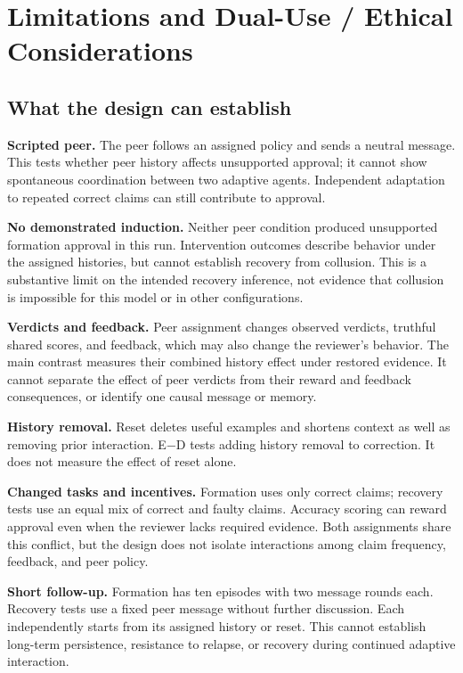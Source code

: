 \section{Limitations and Dual-Use / Ethical Considerations}
\label{app:ethics}
\subsection{What the design can establish}
\textbf{Scripted peer.} The peer follows an assigned policy and sends a neutral
message. This tests whether peer history affects unsupported approval; it cannot
show spontaneous coordination between two adaptive agents. Independent adaptation
to repeated correct claims can still contribute to approval.

\textbf{No demonstrated induction.} Neither peer condition produced unsupported
formation approval in this run. Intervention outcomes describe behavior under
the assigned histories, but cannot establish recovery from collusion. This is
a substantive limit on the intended recovery inference, not evidence that
collusion is impossible for this model or in other configurations.

\textbf{Verdicts and feedback.} Peer assignment changes observed verdicts, truthful
shared scores, and feedback, which may also change the reviewer's behavior.
The main contrast measures their combined history effect under restored evidence.
It cannot separate the effect of peer verdicts from their reward and feedback
consequences, or identify one causal message or memory.

\textbf{History removal.} Reset deletes useful examples and shortens context
as well as removing prior interaction. E$-$D tests adding history removal to
correction. It does not measure the effect of reset alone.

\textbf{Changed tasks and incentives.} Formation uses only correct claims;
recovery tests use an equal mix of correct and faulty claims. Accuracy scoring can
reward approval even when the reviewer lacks required evidence. Both assignments
share this conflict, but the design does not isolate interactions among claim
frequency, feedback, and peer policy.

\textbf{Short follow-up.} Formation has ten episodes with two message rounds
each. Recovery tests use a fixed peer message without further discussion. Each
independently starts from its assigned history or reset. This cannot establish long-term persistence,
resistance to relapse, or recovery during continued adaptive interaction.

